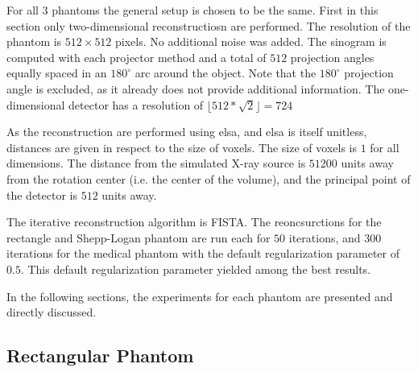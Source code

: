 For all 3 phantoms the general setup is chosen to be the same. First in this section only
two-dimensional reconstructiosn are performed. The resolution of the phantom is \(512 \times 512\)
pixels. No additional noise was added. The sinogram is computed with each projector method and a
total of \(512\) projection angles equally spaced in an \(180^\circ\) arc around the object. Note
that the \(180^\circ\) projection angle is excluded, as it already does not provide additional
information. The one-dimensional detector has a resolution of \(\lfloor 512 * \sqrt{2} \rfloor =
724\)

As the reconstruction are performed using elsa, and elsa is itself unitless, distances are given in
respect to the size of voxels.   The size of voxels is \(1\) for all
dimensions. The distance from the simulated X-ray source is \(51200\) units away from the rotation
center (i.e. the center of the volume), and the principal point of the detector is \(512\) units
away.

The iterative reconstruction algorithm is \gls{FISTA}. The reoncsurctions for the rectangle and
Shepp-Logan phantom are run each for \(50\) iterations, and \(300\) iterations for the medical
phantom with the default regularization parameter of \(0.5\). This default regularization parameter
yielded among the best results.

In the following sections, the experiments for each phantom are presented and directly discussed.

\subsection{Rectangular Phantom}

